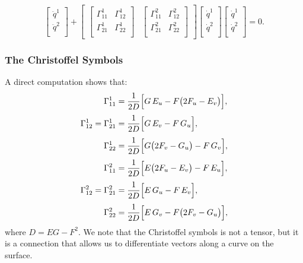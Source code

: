 \documentclass[12pt]{article}
\begin{document}
\[
\begin{bmatrix}
\ddot{q}^{1} \\
\ddot{q}^{2} \\
\end{bmatrix} + \begin{bmatrix}
\begin{bmatrix}
\Gamma_{11}^{1} & \Gamma_{12}^{1} \\
\Gamma_{21}^{1} & \Gamma_{22}^{1} \\
\end{bmatrix} & \begin{bmatrix}
\Gamma_{11}^{2} & \Gamma_{12}^{2} \\
\Gamma_{21}^{2} & \Gamma_{22}^{2} \\
\end{bmatrix}
\end{bmatrix} \begin{bmatrix}
\dot{q}^{1} \\
\dot{q}^{2} \\
\end{bmatrix} \begin{bmatrix}
\dot{q}^{1} \\
\dot{q}^{2} \\
\end{bmatrix} = 0.
\]

\subsubsection{The Christoffel Symbols}
A direct computation shows that:
\[
\begin{aligned}
\Gamma^1_{11} &= \frac{1}{2D}\Bigl[G\,E_u - F\bigl(2F_u - E_v\bigr)\Bigr],\\[1mm]
\Gamma^1_{12} = \Gamma^1_{21} &= \frac{1}{2D}\Bigl[G\,E_v - F\,G_u\Bigr],\\[1mm]
\Gamma^1_{22} &= \frac{1}{2D}\Bigl[G\bigl(2F_v - G_u\bigr) - F\,G_v\Bigr],\\[1mm]
\Gamma^2_{11} &= \frac{1}{2D}\Bigl[E\bigl(2F_u - E_v\bigr) - F\,E_u\Bigr],\\[1mm]
\Gamma^2_{12} = \Gamma^2_{21} &= \frac{1}{2D}\Bigl[E\,G_u - F\,E_v\Bigr],\\[1mm]
\Gamma^2_{22} &= \frac{1}{2D}\Bigl[E\,G_v - F\bigl(2F_v - G_u\bigr)\Bigr],
\end{aligned}
\]
where \(D = EG - F^2\).
We note that the Christoffel symbols is not a tensor, but it is a connection that allows us to differentiate vectors along a curve on the surface.
\end{document}
